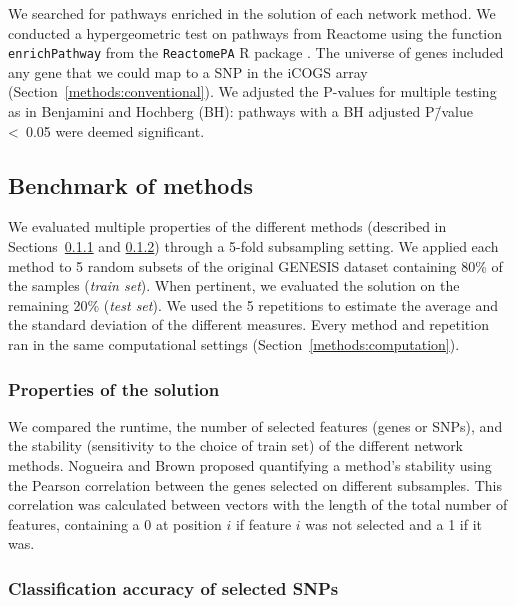 \documentclass[10pt,letterpaper]{article}
\begin{document}
We searched for pathways enriched in the solution of each network method. We conducted a hypergeometric test on pathways from Reactome \cite{Jassal2019} using the function \texttt{enrichPathway} from the \texttt{ReactomePA} R package \cite{Yu2016}. The universe of genes included any gene that we could map to a SNP in the iCOGS array (Section~\ref{methods:conventional}). We adjusted the P-values for multiple testing as in Benjamini and Hochberg \cite{Benjamini1995} (BH): pathways with a BH adjusted P\=/value \textless~0.05 were deemed significant.

\subsection{Benchmark of methods}
\label{methods:benchmark}

We evaluated multiple properties of the different methods (described in Sections~\ref{methods:algorithm_comparison} and \ref{methods:classifier}) through a 5-fold subsampling setting. We applied each method to 5 random subsets of the original GENESIS dataset containing 80\% of the samples (\emph{train set}). When pertinent, we evaluated the solution on the remaining 20\% (\emph{test set}). We used the 5 repetitions to estimate the average and the standard deviation of the different measures. Every method and repetition ran in the same computational settings (Section~\ref{methods:computation}).

\subsubsection{Properties of the solution}
\label{methods:algorithm_comparison}

We compared the runtime, the number of selected features (genes or SNPs), and the stability (sensitivity to the choice of train set) of the different network methods. Nogueira and Brown \cite{nogueira_measuring_2016} proposed quantifying a method's stability using the Pearson correlation between the genes selected on different subsamples. This correlation was calculated between vectors with the length of the total number of features, containing a 0 at position $i$ if feature $i$ was not selected and a 1 if it was.

\subsubsection{Classification accuracy of selected SNPs}
\label{methods:classifier}
\end{document}
